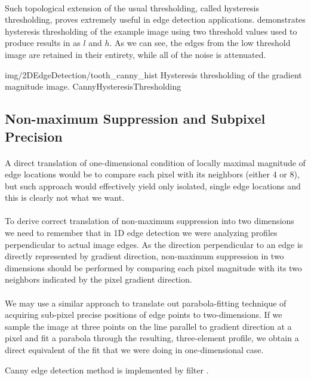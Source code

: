 \paragraph*{}
Such topological extension of the usual thresholding, called hysteresis thresholding, proves extremely useful in edge detection applications.  demonstrates hysteresis thresholding of the example image using two threshold values used to produce results in  as $l$ and $h$. As we can see, the edges from the low threshold image are retained in their entirety, while all of the noise is attenuated.

\oneFigure
{img/2DEdgeDetection/tooth_canny_hist}
{Hysteresis thresholding of the gradient magnitude image.}
{CannyHysteresisThresholding}
{\basicWidth}

\subsection{Non-maximum Suppression and Subpixel Precision}

\paragraph*{}
A direct translation of one-dimensional condition of locally maximal magnitude of edge locations would be to compare each pixel with its neighbors (either 4 or 8), but such approach would effectively yield only isolated, single edge locations and this is clearly not what we want.

\paragraph*{}
To derive correct translation of non-maximum suppression into two dimensions we need to remember that in 1D edge detection we were analyzing profiles perpendicular to actual image edges. As the direction perpendicular to an edge is directly represented by gradient direction, non-maximum suppression in two dimensions should be performed by comparing each pixel magnitude with its two neighbors indicated by the pixel gradient direction.

\paragraph*{}
We may use a similar approach to translate out parabola-fitting technique of acquiring sub-pixel precise positions of edge points to two-dimensions. If we sample the image at three points on the line parallel to gradient direction at a pixel and fit a parabola through the resulting, three-element profile, we obtain a direct equivalent of the fit that we were doing in one-dimensional case.

\begin{refImpl}
Canny edge detection method is implemented by \studio filter .
\end{refImpl}